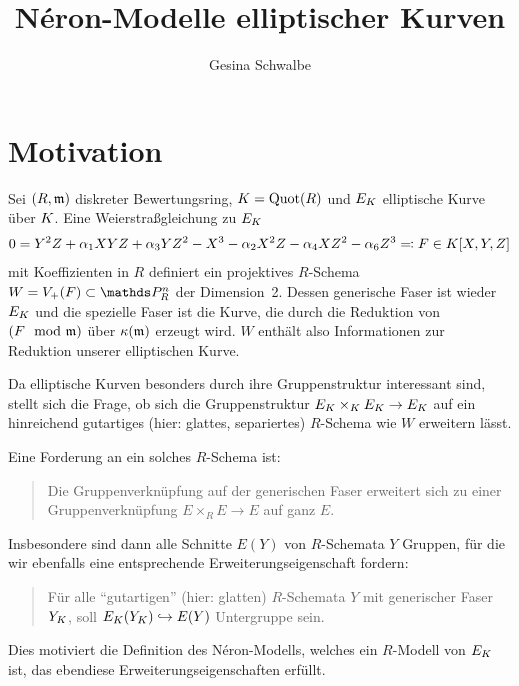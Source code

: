 \documentclass[german, bibliography=totoc]{scrreprt}
\title{
  Néron-Modelle elliptischer Kurven
}
\author{Gesina Schwalbe}
\begin{document}
\maketitle
\tableofcontents

\chapter{Motivation}

Sei $(R,\mathfrak{m})$ diskreter Bewertungsring, $K=\operatorname{Quot}(R)$ und $E_{K}$
elliptische Kurve über $K$. Eine Weierstraßgleichung zu $E_{K}$
\begin{gather*}
  0 = Y^2 Z + \alpha_1 XYZ + \alpha_3 YZ^2 - X^3 - \alpha_2X^2 Z - \alpha_4 XZ^2 - \alpha_6 Z^3
  \eqqcolon F\in K[X,Y,Z]  
\end{gather*}
mit Koeffizienten in $R$ definiert ein projektives $R$-Schema
$W=V_+(F)\subset\P_R^n$ der Dimension~2. Dessen generische Faser
ist wieder $E_{K}$ und die spezielle Faser ist die Kurve, die durch die
Reduktion von $(F\mod{\mathfrak{m}})$ über $\kappa(\mathfrak{m})$ erzeugt wird.
$W$ enthält also Informationen zur Reduktion unserer elliptischen
Kurve.

Da elliptische Kurven besonders durch ihre Gruppenstruktur
interessant sind, stellt sich die Frage, ob sich die
Gruppenstruktur $E_{K}\times_{K} E_{K}\to E_{K}$ auf ein hinreichend
gutartiges (hier: glattes, separiertes) $R$-Schema wie $W$ erweitern
lässt.

Eine Forderung an ein solches $R$-Schema ist:
\begin{quote}
  Die Gruppenverknüpfung auf der generischen Faser erweitert sich zu
  einer Gruppenverknüpfung $E\times_R E\to E$ auf ganz $E$.
\end{quote}
Insbesondere sind dann alle Schnitte $E(Y)$ von
$R$-Schemata $Y$ Gruppen, für die wir ebenfalls eine entsprechende
Erweiterungseigenschaft fordern:
\begin{quote}
  Für alle \enquote{gutartigen} (hier: glatten) $R$-Schemata $Y$ mit
  generischer Faser $Y_{K}$, soll $E_{K}(Y_{K})\hookrightarrow E(Y)$
  Untergruppe sein.
\end{quote}
Dies motiviert die Definition des Néron-Modells, welches
ein $R$-Modell von $E_{K}$ ist, das ebendiese Erweiterungseigenschaften
erfüllt.
\end{document}
